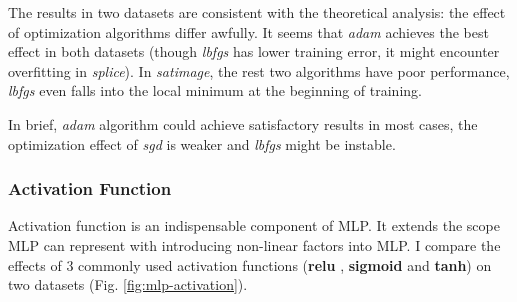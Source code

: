 \documentclass[12pt,a4paper]{article}
\theoremstyle{definition}
\begin{document}
The results in two datasets are consistent with the theoretical analysis: the effect of optimization algorithms differ awfully. It seems that \textit{adam} achieves the best effect in both datasets (though \textit{lbfgs} has lower training error, it might encounter overfitting in \textit{splice}). In \textit{satimage}, the rest two algorithms have poor performance, \textit{lbfgs} even falls into the local minimum at the beginning of training.

\vspace{0.01\linewidth}
In brief, \textit{adam} algorithm could achieve satisfactory results in most cases, the optimization effect of \textit{sgd} is weaker and \textit{lbfgs} might be instable.

\subsubsection{Activation Function}

Activation function is an indispensable component of MLP. It extends the scope MLP can represent with introducing non-linear factors into MLP. I compare the effects of 3 commonly used activation functions (\textbf{relu} \cite{relu}, \textbf{sigmoid} and \textbf{tanh}) on two datasets (Fig. \ref{fig:mlp-activation}).
\end{document}
